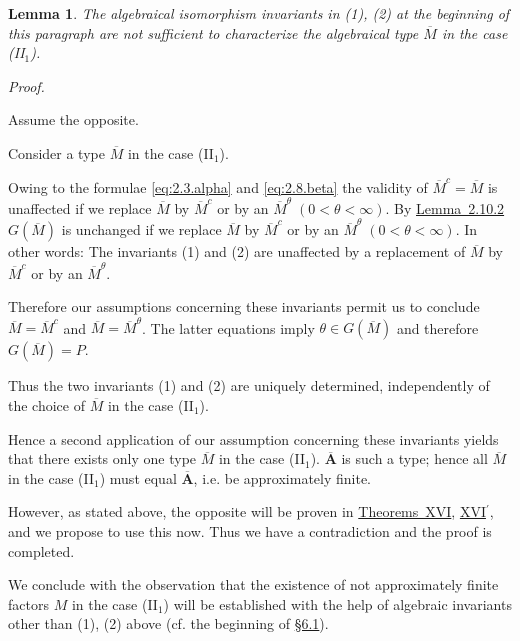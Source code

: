 \documentclass[b5paper,twoside]{article}
\newcommand{\secref}[2]{\hyperref[#1]{\mbox{\S#2}}}
\newcommand{\lemref}[2]{\hyperref[#1]{\mbox{Lemma~#2}}}
\theoremstyle{mvnplain}
\newtheorem{lemma}{Lemma}[section]
\renewenvironment{proof}[1][Proof]{%
  \par\addvspace{0.35\baselineskip}%
  \noindent\textit{#1.}\ \normalfont\ignorespaces
}{%
  \par\addvspace{0.35\baselineskip}%
}
\newcommand{\M}{\mathbf M}
\def\M{M}%
\def\mathfrak#1{#1}%
\begin{document}
\begin{lemma}\label{lem:4.8.5}
The algebraical isomorphism invariants in (1), (2) at the beginning of this
paragraph are not sufficient to characterize the algebraical type
\(\overline{\M}\) in the case (II\(_1\)).
\end{lemma}

\begin{proof}
Assume the opposite.

Consider a type \(\overline{\M}\) in the case (II\(_1\)).

Owing to the formulae \eqref{eq:2.3.alpha} and \eqref{eq:2.8.beta} the
validity of \(\overline{\M}^{c}=\overline{\M}\) is unaffected if we replace
\(\overline{\M}\) by \(\overline{\M}^{c}\) or by an
\(\overline{\M}^{\theta}\;(0<\theta<\infty)\). By
\lemref{lem:2.10.2}{2.10.2} \(\mathfrak G(\overline{\M})\) is unchanged if
we replace \(\overline{\M}\) by \(\overline{\M}^{c}\) or by an
\(\overline{\M}^{\theta}\;(0<\theta<\infty)\). In other words: The
invariants (1) and (2) are unaffected by a replacement of \(\overline{\M}\)
by \(\overline{\M}^{c}\) or by an \(\overline{\M}^{\theta}\).

Therefore our assumptions concerning these invariants permit us to conclude
\(\overline{\M}=\overline{\M}^{c}\) and
\(\overline{\M}=\overline{\M}^{\theta}\). The latter equations imply
\(\theta\in\mathfrak G(\overline{\M})\) and therefore
\(\mathfrak G(\overline{\M})=P\).

Thus the two invariants (1) and (2) are uniquely determined, independently of
the choice of \(\overline{\M}\) in the case (II\(_1\)).

Hence a second application of our assumption concerning these invariants
yields that there exists only one type \(\overline{\M}\) in the case
(II\(_1\)). \(\overline{\mathbf A}\) is such a type; hence all
\(\overline{\M}\) in the case (II\(_1\)) must equal
\(\overline{\mathbf A}\), i.e. be approximately finite.

However, as stated above, the opposite will be proven in
\hyperref[thm:XVI]{\mbox{Theorems XVI}},
\hyperref[thm:XVI-prime]{\mbox{XVI\(^{\prime}\)}}, and we
propose to use this now. Thus we have a contradiction and the
proof is completed.
\end{proof}

We conclude with the observation that the existence of not approximately
finite factors \(\M\) in the case (II\(_1\)) will be established with the help
of algebraic invariants other than (1), (2) above (cf. the beginning of
\secref{sec:6.1}{6.1}).
\end{document}
